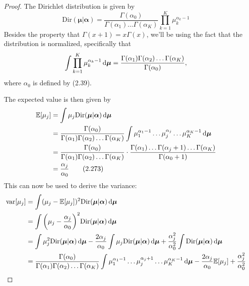 \begin{proof}
    The Dirichlet distribution is given by
    \begin{equation*}
        \text{Dir}(\bm{\mu} | \bm{\alpha})
        = \frac{\Gamma(\alpha_0)}{\Gamma(\alpha_1)\ldots\Gamma(\alpha_K)}
        \prod_{k = 1}^K \mu_k^{\alpha_k - 1}
        \tag{2.38}\label{eq:2.38}
    \end{equation*}
    Besides the property that $\Gamma(x+1) = x\Gamma(x)$, we'll be using the fact that the distribution is normalized,
    specifically that
    \[
        \int \prod_{k = 1}^K \mu_k^{\alpha_k - 1} \mathop{}\!\mathrm{d} \bm{\mu}
        = \frac{\Gamma(\alpha_1)\Gamma(\alpha_2)\ldots\Gamma(\alpha_K)}{\Gamma(\alpha_0)},
    \]
    where $\alpha_0$ is defined by (2.39).

    The expected value is then given by
    \begin{align*}
        \mathbb{E}[\mu_j] 
        &= \int \mu_j \text{Dir}(\bm{\mu} | \bm{\alpha}) \mathop{}\!\mathrm{d} \bm{\mu} \\
        &= \frac{\Gamma(\alpha_0)}{\Gamma(\alpha_1)\Gamma(\alpha_2)\ldots\Gamma(\alpha_K)}
        \int \mu_1^{\alpha_1 - 1}\dots\mu_j^{\alpha_j}\ldots\mu_K^{\alpha_K - 1} \mathop{}\!\mathrm{d} \bm{\mu} \\
        &= \frac{\Gamma(\alpha_0)}{\Gamma(\alpha_1)\Gamma(\alpha_2)\ldots\Gamma(\alpha_K)}
        \cdot \frac{\Gamma(\alpha_1)\ldots\Gamma(\alpha_j + 1)\ldots\Gamma(\alpha_K)}
        {\Gamma(\alpha_0 + 1)} \\
        &= \frac{\alpha_j}{\alpha_0} 
        \tag{2.273}
    \end{align*}
    This can now be used to derive the variance:
    \begin{align*}
        \text{var}[\mu_j] 
        &= \int (\mu_j - \mathbb{E}[\mu_j])^2 \text{Dir}(\bm{\mu} | \bm{\alpha}) \diff \bm{\mu} \\
        &= \int \bigg(\mu_j - \frac{\alpha_j}{\alpha_0}\bigg)^2 
        \text{Dir}(\bm{\mu} | \bm{\alpha}) \diff \bm{\mu} \\
        &= \int \mu_j^2 \text{Dir}(\bm{\mu} | \bm{\alpha}) \diff \bm{\mu}
        - \frac{2\alpha_j}{\alpha_0}\int \mu_j\text{Dir}(\bm{\mu} | \bm{\alpha}) \diff \bm{\mu}
        + \frac{\alpha_j^2}{\alpha_0^2} \int \text{Dir}(\bm{\mu} | \bm{\alpha}) \diff \bm{\mu} \\
        &= \frac{\Gamma(\alpha_0)}{\Gamma(\alpha_1)\Gamma(\alpha_2)\ldots\Gamma(\alpha_K)}
        \int \mu_1^{\alpha_1 - 1}\dots\mu_j^{\alpha_j + 1}\ldots\mu_K^{\alpha_K - 1} \diff \bm{\mu} 
        - \frac{2\alpha_j}{\alpha_0} \mathbb{E}[\mu_j] + \frac{\alpha_j^2}{\alpha_0^2} \\

\end{align*}
\end{proof}
